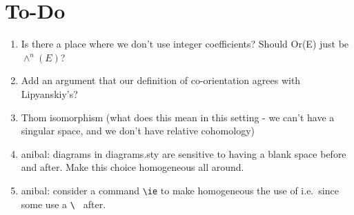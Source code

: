 
\section*{To-Do}
\begin{enumerate}
	\item Is there a place where we don't use integer coefficients? Should Or(E) just be $\wedge^n(E)$?

	\item Add an argument that our definition of co-orientation agrees with Lipyanskiy's?

	\item Thom isomorphism (what does this mean in this setting - we can't have a singular space, and we don't have relative cohomology)




	\item anibal: diagrams in diagrams.sty are sensitive to having a blank space before and after.
	Make this choice homogeneous all around.

	\item anibal: consider a command \verb|\ie| to make homogeneous the use of i.e.\ since some use a \verb|\ | after.


\begin{comment}
	\item \sout{Picture for creasing.}
	\item Compactness and orientation assumptions on Theorem 3.13 (transversality constrains preserve q-iso type).

	\item \sout{Treatment of creasing.}
	\item Guillemin-Pollock for mnfds with corner.

	\item Clarify isomorphisms used in orientations and make more explicit how the Lipyanskiy orientations fit.


	\item More on Mayer-Vietoris - check full argument
	\item Poincar\'e Lemma - check new proof
	\item (Anibal) Add a better treatment of ``cst" from \verb|Flows/old/pd_cubical_S2.Feb16.tex| \\
	Greg: Let K be any finite set of cubical faces and let L be a single cubical face. We need $cst(K) \cup cst(L)$ to be $cst(K \cup L)$ (maybe this part is just by definition?) and we need $cst(K) \cap cst(L)$ to be $cst(K ? L)$ where $K ? L$ needs to be some set of faces with cardinality less than or equal to that of K.
\end{comment}


\end{enumerate}
